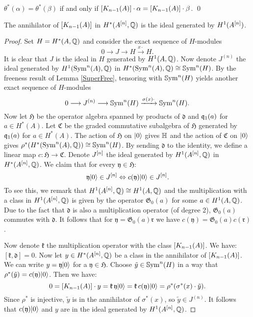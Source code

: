 \begin{corollary} \label{KummerEquality}
$\theta^*(\alpha) = \theta^*(\beta)$ if and only if $[\kum{A}{n-1}]\cdot \alpha = [\kum{A}{n-1}]\cdot \beta$. 
\qed
\end{corollary}

\begin{proposition}\label{Annihideal}
The annihilator of $[\kum{A}{n-1}]$ in $H^*(A\hilb{n},\Q)$ is the ideal generated by $H^1(A\hilb{n})$. 
\end{proposition}
\begin{proof}
Set $H=H^*(A,\Q)$ and consider the exact sequence of $H$-modules
$$
0 \longrightarrow 
J
\longrightarrow H \stackrel{x\cdot}{\longrightarrow} H.
$$
It is clear that $J$ is the ideal in $H$ generated by $H^{1}(A,\Q)$. 
Now denote $J^{(n)}$ the ideal generated by $H^1(\Sym^n(A),\Q)$ in $H^*(\Sym^n(A),\Q)\cong\SSym^n(H)$.
By the freeness result of Lemma \ref{SuperFree}, tensoring with $\SSym^n(H)$ yields another exact sequence of $H$-modules
$$
0 \longrightarrow {J}^{(n)} \longrightarrow \SSym^n(H) \xrightarrow{\sigma(x)\cdot} \SSym^n(H).
$$
Now let $\mathfrak{H}$ be the operator algebra spanned by products of $\mathfrak d$ and $\q_1(a)$ for $a\in H^*(A)$. Let $\mathfrak C$ be the graded commutative subalgebra of $\mathfrak H$ generated by $\q_1(a)$ for $a\in H^*(A)$. The action of $\mathfrak H$ on $\vac$ gives $\H$ and the action of $\mathfrak C$ on $\vac$ gives $\rho^*(H^*(\Sym^n(A),\Q))\cong \SSym^n(H)$.
By sending $\mathfrak d$ to the identity, we define a linear map $c : \mathfrak H \rightarrow \mathfrak C$. 
Denote $J\hilb{n}$ the ideal generated by $H^1(A\hilb{n},\Q)$ in $H^*(A \hilb n,\Q)$. We claim that for every $\mathfrak y\in \mathfrak H$:
$$
\mathfrak y\vac \in J\hilb{n} \Leftrightarrow c(\mathfrak y)\vac \in J\hilb{n}.
$$
To see this, we remark that $H^1(A \hilb n,\Q) \cong H^1(A ,\Q)  $ and the multiplication with a class in $H^1(A \hilb n,\Q) $ is given by the operator $\mathfrak G_0(a)$ for some $a\in H^1(A ,\Q)$. Due to the fact that $\mathfrak d$ is also a multiplication operator (of degree 2), $\mathfrak G_0(a)$ commutes with $\mathfrak d$. It follows that for $\mathfrak y =\mathfrak G_0(a) \mathfrak r$ we have $c(\mathfrak y) = \mathfrak G_0(a) c(\mathfrak r)$.

Now denote $\mathfrak k$ the multiplication operator with the class $[\kum{A}{n-1}]$. We have:
$
[\mathfrak k, \mathfrak d] = 0.
$
Now let $y\in H^*(A\hilb{n},\Q)$ be a class in the annihilator of $[\kum{A}{n-1}]$. We can write $y= \mathfrak y\vac$ for a $\mathfrak y\in\mathfrak H$. Choose $\tilde y \in \SSym^n (H)$ in a way that $\rho^*(\tilde y) = c(\mathfrak y) \vac$. Then we have:
$$
0=[\kum{A}{n-1}]\cdot y = \mathfrak k\, \mathfrak y \vac =  \mathfrak k \,c(\mathfrak y)\vac = \rho^*(\sigma^*(x) \cdot \tilde y).
$$
Since $\rho^*$ is injective, $\tilde y$ is in the annihilator of $\sigma^*(x)$, so $\tilde y \in J^{(n)}$. It follows that $c(\mathfrak y)\vac$ and $y$ are in the ideal generated by $H^1(A\hilb{n},\Q)$.
\end{proof}

